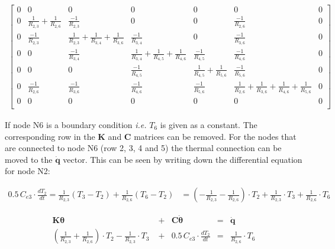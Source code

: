 \begin{equation}
	\begin{aligned}
		\begin{bmatrix}
			0 & 0 & 0 & 0 & 0 & 0 & 0 \\
			0 & \frac{1}{R_{2,3}} + \frac{1}{R_{2,6}} & \frac{-1}{R_{2,3}} & 0 & 0 & \frac{-1}{R_{2,6}} & 0 \\
			0 & \frac{-1}{R_{2,3}} & \frac{1}{R_{2,3}} + \frac{1}{R_{3,4}} + \frac{1}{R_{3,6}} & \frac{-1}{R_{3,4}} & 0 & \frac{-1}{R_{3,6}} & 0 \\
			0 & 0 & \frac{-1}{R_{3,4}} & \frac{1}{R_{3,4}} +  \frac{1}{R_{4,5}} + \frac{1}{R_{4,6}} & \frac{-1}{R_{4,5}} & \frac{-1}{R_{4,6}} & 0\\
			0 & 0 & 0 & \frac{-1}{R_{4,5}} & \frac{1}{R_{4,5}} + \frac{1}{R_{5,6}} & \frac{-1}{R_{5,6}} & 0 \\
			0 & \frac{-1}{R_{2,6}} & \frac{-1}{R_{3,6}} & \frac{-1}{R_{4,6}} & \frac{-1}{R_{5,6}} & \frac{1}{R_{2,6}} + \frac{1}{R_{3,6}} +  \frac{1}{R_{4,6}} + \frac{1}{R_{5,6}} & 0\\
			0 & 0 & 0 & 0 & 0 & 0 & 0\\
		\end{bmatrix}
	\end{aligned}
\end{equation}

If node N6 is a boundary condition \emph{i.e.} $T_6$ is given as a constant. The corresponding row in the $\mathbf{K}$ and $\mathbf{C}$ matrices can be removed. For the nodes that are connected to node N6 (row 2, 3, 4 and 5) the thermal connection can be moved to the $\mathbf{\dot{q}}$ vector. This can be seen by writing down the differential equation for node N2:

\begin{equation}
	\begin{aligned}
        0.5 \, C_{e3} \cdot \frac{dT_2}{dt} = \frac{1}{R_{2,3}} (T_3 - T_2) + \frac{1}{R_{2,6}} (T_6 - T_2) & = (-\frac{1}{R_{2,3}} - \frac{1}{R_{2,6}}) \cdot T_2 + \frac{1}{R_{2,3}} \cdot T_3 + \frac{1}{R_{2,6}} \cdot T_6 
	\end{aligned}
\end{equation}

\begin{equation}
	\begin{aligned}
        \mathbf{K \theta} \qquad & + & \mathbf{C \dot{\theta}} & = & \mathbf{\dot{q}} \\
		(\frac{1}{R_{2,3}} + \frac{1}{R_{2,6}}) \cdot T_2 - \frac{1}{R_{2,3}} \cdot T_3 \; & + & 0.5 \, C_{e3} \cdot \frac{dT_2}{dt} & = & \frac{1}{R_{2,6}} \cdot T_6
	\end{aligned}
\end{equation}

